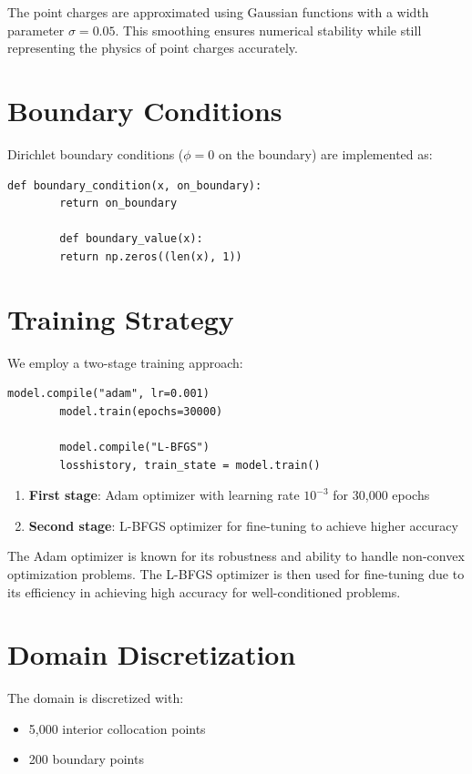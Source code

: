 \documentclass[12pt,a4paper]{report}
\begin{document}
	The point charges are approximated using Gaussian functions with a width parameter $\sigma = 0.05$. This smoothing ensures numerical stability while still representing the physics of point charges accurately.
	
	\section{Boundary Conditions}
	Dirichlet boundary conditions ($\phi = 0$ on the boundary) are implemented as:
	
	\begin{lstlisting}[caption={Boundary condition implementation}]
		def boundary_condition(x, on_boundary):
		return on_boundary
		
		def boundary_value(x):
		return np.zeros((len(x), 1))
	\end{lstlisting}
	
	\section{Training Strategy}
	We employ a two-stage training approach:
	
	\begin{lstlisting}[caption={Two-stage training process}]
		model.compile("adam", lr=0.001)
		model.train(epochs=30000)
		
		model.compile("L-BFGS")
		losshistory, train_state = model.train()
	\end{lstlisting}
	
	\begin{enumerate}
		\item \textbf{First stage}: Adam optimizer with learning rate $10^{-3}$ for 30,000 epochs
		\item \textbf{Second stage}: L-BFGS optimizer for fine-tuning to achieve higher accuracy
	\end{enumerate}
	
	The Adam optimizer is known for its robustness and ability to handle non-convex optimization problems. The L-BFGS optimizer is then used for fine-tuning due to its efficiency in achieving high accuracy for well-conditioned problems.
	
	\section{Domain Discretization}
	The domain is discretized with:
	\begin{itemize}
		\item 5,000 interior collocation points
		\item 200 boundary points
	\end{itemize}
	
\end{document}
